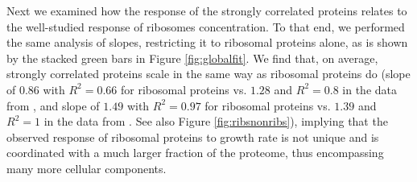 Next we examined how the response of the strongly correlated proteins relates to the well-studied response of ribosomes concentration.
To that end, we performed the same analysis of slopes, restricting it to ribosomal proteins alone, as is shown by the stacked green bars in Figure \ref{fig:globalfit}.
We find that, on average, strongly correlated proteins scale in the same way as ribosomal proteins do (slope of $0.86$ with $R^2=0.66$ for ribosomal proteins vs. $1.28$ and $R^2=0.8$ in the data from \cite{Heinemann2015}, and slope of $1.49$ with $R^2=0.97$ for ribosomal proteins vs. $1.39$ and $R^2=1$ in the data from \cite{Valgepea2013}. See also Figure \ref{fig:ribsnonribs}), implying that the observed response of ribosomal proteins to growth rate is not unique and is coordinated with a much larger fraction of the proteome, thus encompassing many more cellular components.
